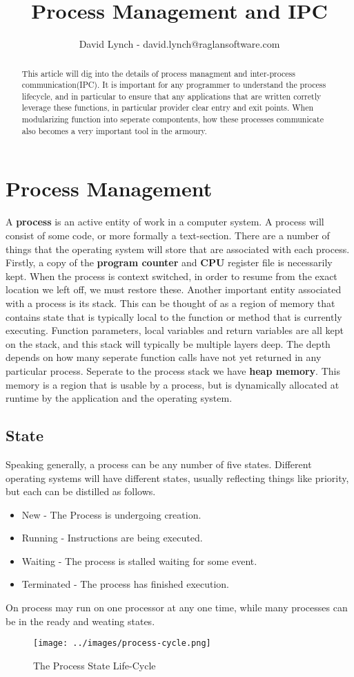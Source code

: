 \documentclass[10pt,a4paper]{article}
\title{Process Management and IPC}
\author{David Lynch - david.lynch@raglansoftware.com }
\begin{document}
\maketitle
\begin{abstract}
This article will dig into the details of process managment and inter-process communication(IPC). It is important for any programmer to understand the process lifecycle, and in particular to ensure that any applications that are written corretly leverage these functions, in particular provider clear entry and exit points. When modularizing function into seperate compontents, how these processes communicate also becomes a very important tool in the armoury.
\end{abstract}
\section{Process Management}
A {\bf process} is an active entity of work in a computer system. A process will consist of some code, or more formally a text-section. There are a number of things that the operating system will store that are associated with each process. Firstly, a copy of the {\bf program counter} and {\bf CPU} register file is necessarily kept. When the process is context switched, in order to resume from the exact location we left off, we must restore these. Another important entity associated with a process is its stack. This can be thought of as a region of memory that contains state that is typically local to the function or method that is currently executing. Function parameters, local variables and return variables are all kept on the stack, and this stack will typically be multiple layers deep. The depth depends on how many seperate function calls have not yet returned in any particular process. Seperate to the process stack we have {\bf heap memory}. This memory is a region that is usable by a process, but is dynamically allocated at runtime by the application and the operating system.
\subsection{State}
Speaking generally, a process can be any number of five states. Different operating systems will have different states, usually reflecting things like priority, but each can be distilled as follows. 
\begin{itemize}
\item New - The Process is undergoing creation.
\item Running - Instructions are being executed.
\item Waiting - The process is stalled waiting for some event.
\item Terminated - The process has finished execution.
\end{itemize}
On process may run on one processor at any one time, while many processes can be in the ready and weating states. 
\begin{figure}
\caption{The Process State Life-Cycle \cite{OSCONCEPTS}}
\begin{center}
\texttt{[image: ../images/process-cycle.png]}
\label{vmarch}
\end{center}
\end{figure}
\end{document}
